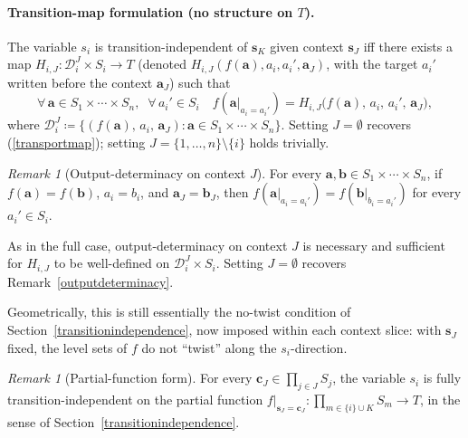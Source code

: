 \documentclass{article}
\theoremstyle{definition}
\theoremstyle{remark}
\newtheorem{remark}[proposition]{Remark}
\begin{document}
\paragraph{Transition-map formulation (no structure on $T$).} The variable $s_i$ is transition-independent of $\boldsymbol{s}_K$ given context $\boldsymbol{s}_J$ iff there exists a map $H_{i,J} \colon \mathcal{D}_i^J \times S_i \to T$ (denoted $H_{i,J}(f(\boldsymbol{a}), a_i, a_i', \boldsymbol{a}_J)$, with the target $a_i'$ written before the context $\boldsymbol{a}_J$) such that
\begin{equation}
\label{contexttransportmap}
\forall\, \boldsymbol{a} \in S_1 \times \cdots \times S_n,\;\; \forall\, a_i' \in S_i \quad
f(\boldsymbol{a}|_{a_i = a_i'}) = H_{i,J}\bigl(f(\boldsymbol{a}),\, a_i,\, a_i',\, \boldsymbol{a}_J\bigr),
\end{equation}
where $\mathcal{D}_i^J \coloneqq\{(f(\boldsymbol{a}),\, a_i,\, \boldsymbol{a}_J) : \boldsymbol{a} \in S_1 \times \cdots \times S_n\}$. Setting $J = \emptyset$ recovers (\ref{transportmap}); setting $J = \{1,\ldots,n\} \setminus \{i\}$ holds trivially.

\begin{remark}[Output-determinacy on context $J$]
\label{contextoutputdeterminacy}
For every $\boldsymbol{a}, \boldsymbol{b} \in S_1 \times \cdots \times S_n$, if $f(\boldsymbol{a}) = f(\boldsymbol{b})$, $a_i = b_i$, and $\boldsymbol{a}_J = \boldsymbol{b}_J$, then $f(\boldsymbol{a}|_{a_i = a_i'}) = f(\boldsymbol{b}|_{b_i = a_i'})$ for every $a_i' \in S_i$.
\end{remark}

\noindent As in the full case, output-determinacy on context $J$ is necessary and sufficient for $H_{i,J}$ to be well-defined on $\mathcal{D}_i^J \times S_i$. Setting $J = \emptyset$ recovers Remark~\ref{outputdeterminacy}.

\medskip

\noindent Geometrically, this is still essentially the no-twist condition of Section~\ref{transitionindependence}, now imposed within each context slice: with $\boldsymbol{s}_J$ fixed, the level sets of $f$ do not ``twist'' along the $s_i$-direction.

\begin{remark}[Partial-function form]
\label{contextpartialform}
For every $\boldsymbol{c}_J \in \prod_{j \in J} S_j$, the variable $s_i$ is fully transition-independent on the partial function $f|_{\boldsymbol{s}_J = \boldsymbol{c}_J} \colon \prod_{m \in \{i\} \cup K} S_m \to T$, in the sense of Section~\ref{transitionindependence}.
\end{remark}
\end{document}
